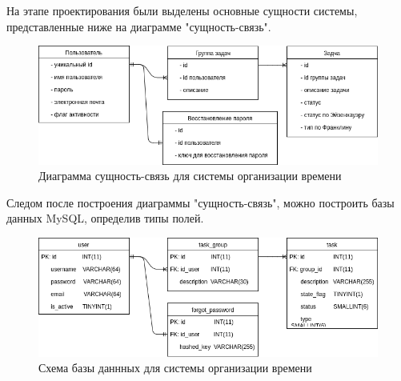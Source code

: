 На этапе проектирования были выделены основные сущности системы, представленные ниже на диаграмме "сущность-связь".

\begin{figure}[ht]
\centering
  \includegraphics[scale=0.5]{images/entity-relation.png}  
  \caption{ Диаграмма сущность-связь для системы организации времени }
  \label{fig:domain:todist}
\end{figure}

Следом после построения диаграммы "сущность-связь", можно построить базы данных MySQL, определив типы полей.

\begin{figure}[ht]
\centering
  \includegraphics[scale=0.5]{images/mysql_schema.png}  
  \caption{ Схема базы даннных для системы организации времени }
  \label{fig:domain:todist}
\end{figure}

